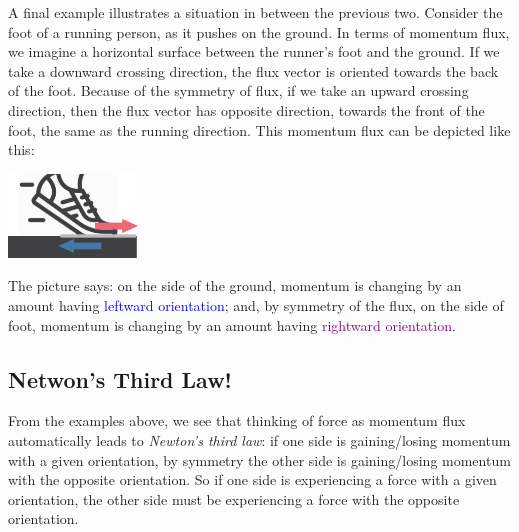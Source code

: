 \documentclass[a4paper,12pt,%
onecolumn,oneside,titlepage,%
british%
]{memoir}
\newcommand{\langnohyph}[1]{\begin{hyphenrules}{nohyphenation}#1\end{hyphenrules}}
\newcommand*{\amp}{\&}
\renewcommand*{\|}[1][]{\nonscript\:#1\vert\nonscript\:\mathopen{}}
\begin{document}
\smallskip

A final example illustrates a situation in between the previous two. Consider the foot of a running person, as it pushes on the ground. In terms of momentum flux,
we imagine a horizontal surface between the runner's foot and the ground. If we take a downward crossing direction, the flux vector is oriented towards the back of the foot. Because of the symmetry of flux, if we take an upward crossing direction, then the flux vector has opposite direction, towards the front of the foot, the same as the running direction. This momentum flux can be depicted like this:\noprelistbreak
\begin{center}
  \medskip
  \includegraphics[height=6em]{images/foot_shear_flux.pdf}
\end{center}
The picture says: on the side of the ground, momentum is changing by an amount having \textcolor{blue}{leftward orientation}; and, by symmetry of the flux, on the side of foot, momentum is changing by an amount having \textcolor{purple}{rightward orientation}.


\subsection{Netwon's Third Law!}
\label{sec:newton_3rd}

%
%
From the examples above, we see that thinking of force as momentum flux automatically leads to \emph{Newton's third law}:
if one side is gaining/losing momentum with a given orientation, by symmetry the other side is gaining/losing momentum with the opposite orientation. So if one side is experiencing a force with a given orientation, the other side must be experiencing a force with the opposite orientation.
\end{document}

